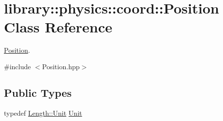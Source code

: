 \hypertarget{classlibrary_1_1physics_1_1coord_1_1_position}{}\section{library\+:\+:physics\+:\+:coord\+:\+:Position Class Reference}
\label{classlibrary_1_1physics_1_1coord_1_1_position}


\hyperlink{classlibrary_1_1physics_1_1coord_1_1_position}{Position}.  




{\ttfamily \#include $<$Position.\+hpp$>$}

\subsection*{Public Types}
\begin{DoxyCompactItemize}
\item 
typedef \hyperlink{classlibrary_1_1physics_1_1units_1_1_length_a3b8b39cd245cf6b19dc34459baeccb18}{Length\+::\+Unit} \hyperlink{classlibrary_1_1physics_1_1coord_1_1_position_aa89cc8ffbcb33e1b347e51b179183613}{Unit}
\end{DoxyCompactItemize}
